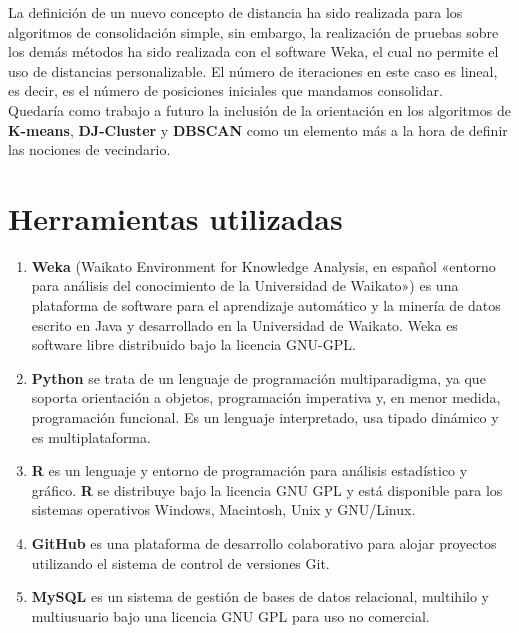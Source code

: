 \documentclass[a4paper, 12pt, spanish]{article}
\begin{document}
La definici\'on de un nuevo concepto de distancia ha sido realizada para los algoritmos de consolidaci\'on simple, sin embargo, la realizaci\'on de pruebas sobre los dem\'as m\'etodos ha sido realizada con el software Weka, el cual no permite el uso de distancias personalizable. El n\'umero de iteraciones en este caso es lineal, es decir, es el n\'umero de posiciones iniciales que mandamos consolidar.\\

Quedar\'ia como trabajo a futuro la inclusi\'on de la orientaci\'on en los algoritmos de \textbf{K-means}, \textbf{DJ-Cluster} y \textbf{DBSCAN} como un elemento m\'as a la hora de definir las nociones de vecindario. \\

\pagebreak
\section{Herramientas utilizadas}

\begin{enumerate}
	\item \textbf{Weka} (Waikato Environment for Knowledge Analysis, en espa\~nol «entorno para an\'alisis del conocimiento de la Universidad de Waikato») es una plataforma de software para el aprendizaje autom\'atico y la miner\'ia de datos escrito en Java y desarrollado en la Universidad de Waikato. Weka es software libre distribuido bajo la licencia GNU-GPL.\cite{weka}
	
	\item \textbf{Python} se trata de un lenguaje de programaci\'on multiparadigma, ya que soporta orientaci\'on a objetos, programaci\'on imperativa y, en menor medida, programaci\'on funcional. Es un lenguaje interpretado, usa tipado dinámico y es multiplataforma.
	
	\item \textbf{R} es un lenguaje y entorno de programaci\'on para an\'alisis estad\'istico y gr\'afico. \textbf{R} se distribuye bajo la licencia GNU GPL y est\'a disponible para los sistemas operativos Windows, Macintosh, Unix y GNU/Linux.\cite{r}
	
	\item \textbf{GitHub} es una plataforma de desarrollo colaborativo para alojar proyectos utilizando el sistema de control de versiones Git.
	
	\item \textbf{MySQL} es un sistema de gesti\'on de bases de datos relacional, multihilo y multiusuario bajo una licencia GNU GPL para uso no comercial.
	
\end{enumerate}
\end{document}
